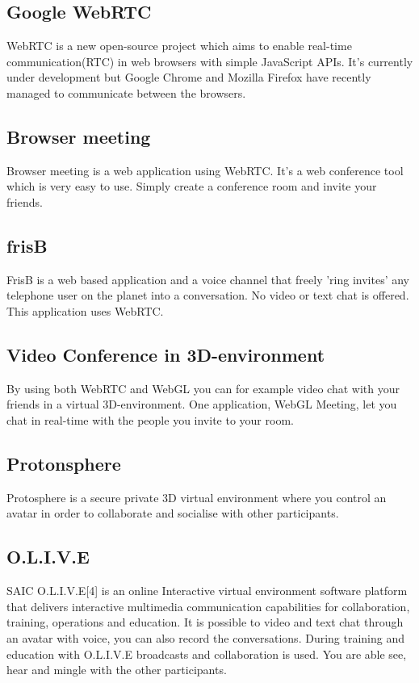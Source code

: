 \documentclass[12pt, titlepage]{article}
\begin{document}
\subsection{Google WebRTC}
WebRTC\cite{27} is a new open-source project which aims to enable real-time communication(RTC) in web browsers with simple JavaScript APIs. It's currently under development but Google Chrome and Mozilla Firefox have recently managed to communicate between the browsers\cite{13}.
\subsection{Browser meeting}
Browser meeting\cite{12} is a web application using WebRTC. It's a web conference tool which is very easy to use. Simply create a conference room and invite your friends.
\subsection{frisB}
FrisB\cite{15} is a web based application and a voice channel that freely 'ring invites' any telephone user on the planet into a conversation. No video or text chat is offered. This application uses WebRTC.
\subsection{Video Conference in 3D-environment}
By using both WebRTC and WebGL you can for example video chat with your friends in a virtual 3D-environment. One application, WebGL Meeting\cite{18}, let you chat in real-time with the people you invite to your room.
\subsection{Protonsphere}
Protosphere\cite{2} is a secure private 3D virtual environment where you control an avatar in order to collaborate and socialise with other participants.
\subsection{O.L.I.V.E}
SAIC O.L.I.V.E[4] is an online Interactive virtual environment software platform that delivers interactive multimedia communication capabilities for collaboration, training, operations and education. It is possible to video and text chat through an avatar with voice, you can also record the conversations. During training and education with O.L.I.V.E broadcasts and collaboration is used. You are able see, hear and mingle with the other participants.
\end{document}
